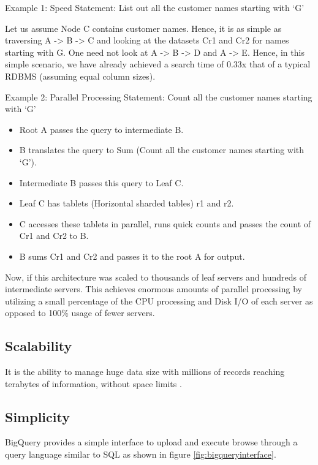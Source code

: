 \documentclass[9pt,twocolumn,twoside]{../../styles/osajnl}
\begin{document}
Example 1: Speed
Statement: List out all the customer names starting with ‘G’

Let us assume Node C contains customer names.  Hence, it is as simple
as traversing A -> B -> C and looking at the datasets Cr1 and Cr2 for
names starting with G. One need not look at A -> B -> D and A ->
E. Hence, in this simple scenario, we have already achieved a search
time of 0.33x that of a typical RDBMS (assuming equal column sizes).

Example 2: Parallel Processing
Statement: Count all the customer names
starting with ‘G’

\begin{itemize}
\item Root A passes the query to intermediate B. \item B translates
  the query to Sum (Count all the customer names starting with
  ‘G’). \item Intermediate B passes this query to Leaf C. \item Leaf C
  has tablets (Horizontal sharded tables) r1 and r2. \item C accesses
  these tablets in parallel, runs quick counts and passes the count of
  Cr1 and Cr2 to B. \item B sums Cr1 and Cr2 and passes it to the root
  A for output. \end{itemize}

Now, if this architecture was scaled to thousands of leaf servers and
hundreds of intermediate servers. This achieves enormous amounts of
parallel processing by utilizing a small percentage of the CPU
processing and Disk I/O of each server as opposed to 100\% usage of
fewer servers.

\subsection{Scalability}
It is the ability to manage huge data size with millions of records
reaching terabytes of information, without space limits .

\subsection{Simplicity}
BigQuery provides a simple interface to upload and execute browse
through a query language similar to SQL as shown in figure \ref{fig:bigqueryinterface}.
\end{document}
